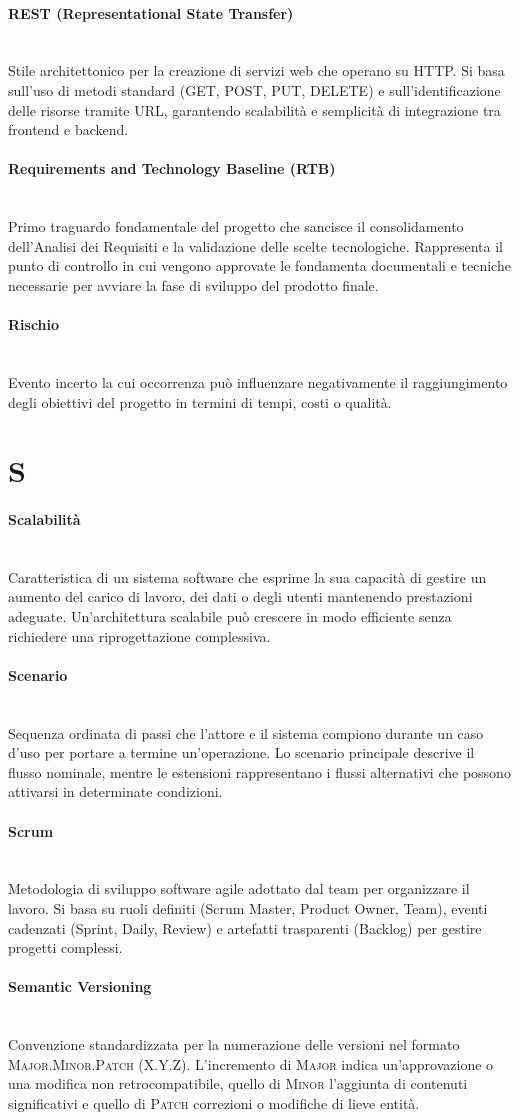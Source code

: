 \documentclass[a4paper, 10pt, colorlinks=true, linkcolor=black, urlcolor=blue, citecolor=blue, hidelinks]{article}
\newcommand{\glossaryterm}[2]{
    \paragraph{#1 \label{term:#1}} \mbox{} \\
    #2
    \vspace{0.5em}
}
\begin{document}
\glossaryterm{REST (Representational State Transfer)}{Stile architettonico per la creazione di servizi web che operano su HTTP. Si basa sull'uso di metodi standard (GET, POST, PUT, DELETE) e sull'identificazione delle risorse tramite URL, garantendo scalabilità e semplicità di integrazione tra frontend e backend.}

\glossaryterm{Requirements and Technology Baseline (RTB)}{Primo traguardo fondamentale del progetto che sancisce il consolidamento dell'Analisi dei Requisiti e la validazione delle scelte tecnologiche. Rappresenta il punto di controllo in cui vengono approvate le fondamenta documentali e tecniche necessarie per avviare la fase di sviluppo del prodotto finale.}

\glossaryterm{Rischio}{Evento incerto la cui occorrenza può influenzare negativamente il raggiungimento degli obiettivi del progetto in termini di tempi, costi o qualità.}

\newpage

\section*{S}

\glossaryterm{Scalabilità}{Caratteristica di un sistema software che esprime la sua capacità di gestire un aumento del carico di lavoro, dei dati o degli utenti mantenendo prestazioni adeguate. Un'architettura scalabile può crescere in modo efficiente senza richiedere una riprogettazione complessiva.}

\glossaryterm{Scenario}{Sequenza ordinata di passi che l'attore e il sistema compiono durante un caso d'uso per portare a termine un'operazione. Lo scenario principale descrive il flusso nominale, mentre le estensioni rappresentano i flussi alternativi che possono attivarsi in determinate condizioni.}

\glossaryterm{Scrum}{Metodologia di sviluppo software agile adottato dal team per organizzare il lavoro. Si basa su ruoli definiti (Scrum Master, Product Owner, Team), eventi cadenzati (Sprint, Daily, Review) e artefatti trasparenti (Backlog) per gestire progetti complessi.}

\glossaryterm{Semantic Versioning}{Convenzione standardizzata per la numerazione delle versioni nel formato \textsc{Major.Minor.Patch} (\textsc{X.Y.Z}). L'incremento di \textsc{Major} indica un'approvazione o una modifica non retrocompatibile, quello di \textsc{Minor} l'aggiunta di contenuti significativi e quello di \textsc{Patch} correzioni o modifiche di lieve entità.}
\end{document}
